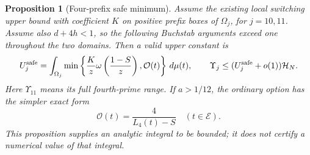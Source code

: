 \documentclass[11pt]{article}
\newtheorem{proposition}[theorem]{Proposition}
\newcommand{\HN}{\mathcal H_N}
\begin{document}
\begin{proposition}[Four-prefix safe minimum]
\label{prop:four-prefix-safe-minimum}
Assume the existing local switching upper bound with coefficient
$K$ on positive prefix boxes of $\Omega_j$, for $j=10,11$.
Assume also $d+4h<1$, so the following Buchstab arguments exceed
one throughout the two domains.  Then a valid upper constant is
\begin{equation}\label{eq:four-prefix-safe-minimum}
 U_j^{\rm safe}
 =\int_{\Omega_j}
   \min\left\{\frac Kz\omega\left(\frac{1-S}{z}\right),
                   \mathcal O(t)\right\}\,d\mu(t),
 \qquad \Upsilon_j\le (U_j^{\rm safe}+o(1))\HN.
\end{equation}
Here $\Upsilon_{11}$ means its full fourth-prime range.  If
$a>1/12$, the ordinary option has the simpler exact form
\begin{equation}\label{eq:four-prefix-rational-kernel}
 \mathcal O(t)=\frac4{L_4(t)-S}\quad(t\in\mathcal E).
\end{equation}
This proposition supplies an analytic integral to be bounded; it
does not certify a numerical value of that integral.
\end{proposition}
\end{document}
